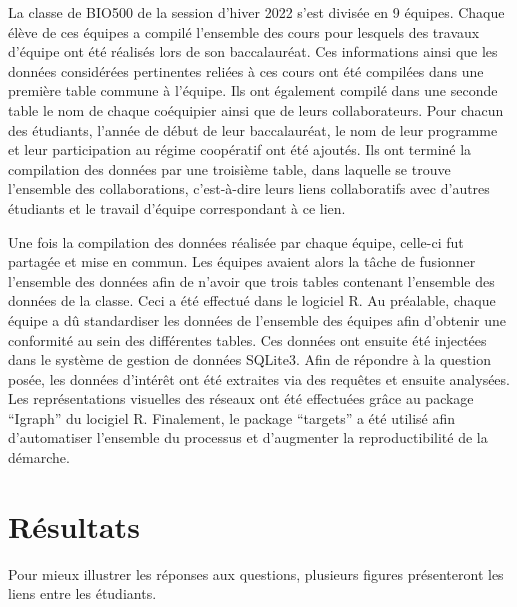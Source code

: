 \documentclass[9pt,twocolumn,twoside,]{pnas-new}
\begin{document}
La classe de BIO500 de la session d'hiver 2022 s'est divisée en 9
équipes. Chaque élève de ces équipes a compilé l'ensemble des cours pour
lesquels des travaux d'équipe ont été réalisés lors de son baccalauréat.
Ces informations ainsi que les données considérées pertinentes reliées à
ces cours ont été compilées dans une première table commune à l'équipe.
Ils ont également compilé dans une seconde table le nom de chaque
coéquipier ainsi que de leurs collaborateurs. Pour chacun des étudiants,
l'année de début de leur baccalauréat, le nom de leur programme et leur
participation au régime coopératif ont été ajoutés. Ils ont terminé la
compilation des données par une troisième table, dans laquelle se trouve
l'ensemble des collaborations, c'est-à-dire leurs liens collaboratifs
avec d'autres étudiants et le travail d'équipe correspondant à ce lien.

Une fois la compilation des données réalisée par chaque équipe, celle-ci
fut partagée et mise en commun. Les équipes avaient alors la tâche de
fusionner l'ensemble des données afin de n'avoir que trois tables
contenant l'ensemble des données de la classe. Ceci a été effectué dans
le logiciel R. Au préalable, chaque équipe a dû standardiser les données
de l'ensemble des équipes afin d'obtenir une conformité au sein des
différentes tables. Ces données ont ensuite été injectées dans le
système de gestion de données SQLite3. Afin de répondre à la question
posée, les données d'intérêt ont été extraites via des requêtes et
ensuite analysées. Les représentations visuelles des réseaux ont été
effectuées grâce au package ``Igraph'' du locigiel R. Finalement, le
package ``targets'' a été utilisé afin d'automatiser l'ensemble du
processus et d'augmenter la reproductibilité de la démarche.

\hypertarget{ruxe9sultats}{%
\section{Résultats}\label{ruxe9sultats}}

Pour mieux illustrer les réponses aux questions, plusieurs figures
présenteront les liens entre les étudiants.
\end{document}
